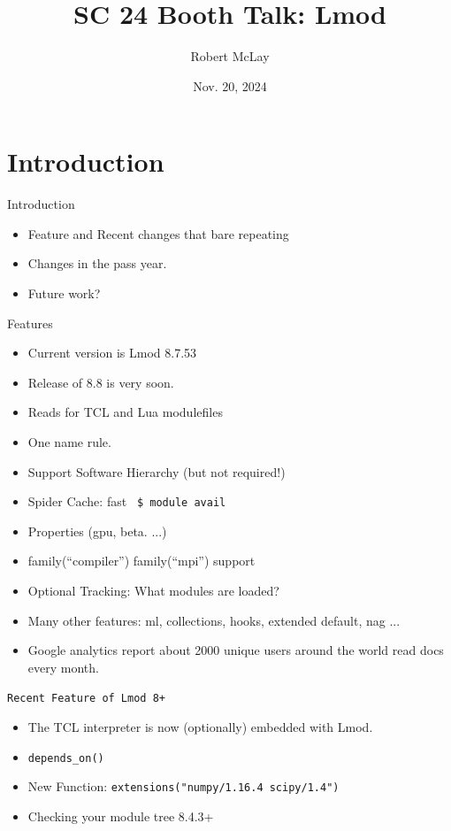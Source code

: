 \documentclass{beamer}
\begin{document}
\title[Lmod]{SC 24 Booth Talk: Lmod}
\author{Robert McLay} 
\date{Nov. 20, 2024}

\frame{\titlepage} 

\section{Introduction}

\begin{frame}{Introduction}
  \begin{itemize}
    \item Feature and Recent changes that bare repeating
    \item Changes in the pass year.
    \item Future work?
  \end{itemize}
\end{frame}

\begin{frame}{Features}
  \begin{itemize}
    \item Current version is Lmod 8.7.53
    \item Release of 8.8 is very soon.
    \item Reads for TCL and Lua modulefiles
    \item One name rule.
    \item Support Software Hierarchy (but not required!)
    \item Spider Cache: fast \texttt{\color{blue} \$ module avail}
    \item Properties (gpu, beta. ...)
    \item family(``compiler'') family(``mpi'') support
    \item Optional Tracking: What modules are loaded?
    \item Many other features: ml, collections, hooks,
      extended default, nag ...
    \item Google analytics report about 2000 unique users around the
      world read docs every month.
  \end{itemize}
\end{frame}

\begin{frame}{\texttt{Recent Feature of Lmod 8+}}
  \begin{itemize}
    \item The TCL interpreter is now (optionally) embedded with Lmod.
    \item \texttt{depends\_on()}
    \item New Function: \texttt{extensions("numpy/1.16.4 scipy/1.4")}
    \item Checking your module tree 8.4.3+
  \end{itemize}
\end{frame}
\end{document}
